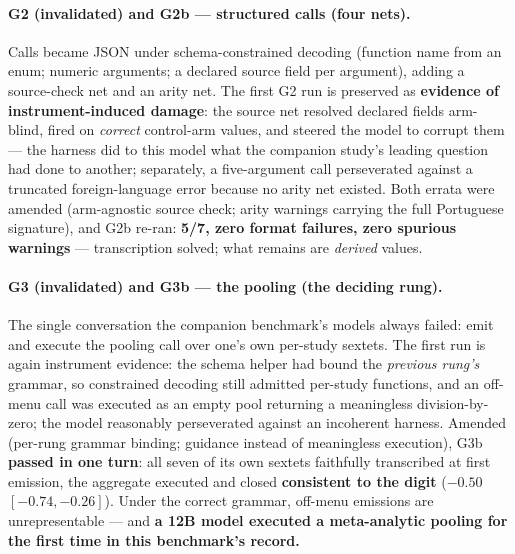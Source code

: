 \documentclass[11pt]{article}
\begin{document}
\paragraph{G2 (invalidated) and G2b --- structured calls (four nets).} Calls became JSON under schema-constrained decoding (function name from an enum; numeric arguments; a declared source field per argument), adding a source-check net and an arity net. The first G2 run is preserved as \textbf{evidence of instrument-induced damage}: the source net resolved declared fields arm-blind, fired on \emph{correct} control-arm values, and steered the model to corrupt them --- the harness did to this model what the companion study's leading question had done to another; separately, a five-argument call perseverated against a truncated foreign-language error because no arity net existed. Both errata were amended (arm-agnostic source check; arity warnings carrying the full Portuguese signature), and G2b re-ran: \textbf{5/7, zero format failures, zero spurious warnings} --- transcription solved; what remains are \emph{derived} values.

\paragraph{G3 (invalidated) and G3b --- the pooling (the deciding rung).} The single conversation the companion benchmark's models always failed: emit and execute the pooling call over one's own per-study sextets. The first run is again instrument evidence: the schema helper had bound the \emph{previous rung's} grammar, so constrained decoding still admitted per-study functions, and an off-menu call was executed as an empty pool returning a meaningless division-by-zero; the model reasonably perseverated against an incoherent harness. Amended (per-rung grammar binding; guidance instead of meaningless execution), G3b \textbf{passed in one turn}: all seven of its own sextets faithfully transcribed at first emission, the aggregate executed and closed \textbf{consistent to the digit} ($-0.50$ $[-0.74, -0.26]$). Under the correct grammar, off-menu emissions are unrepresentable --- and \textbf{a 12B model executed a meta-analytic pooling for the first time in this benchmark's record.}
\end{document}
